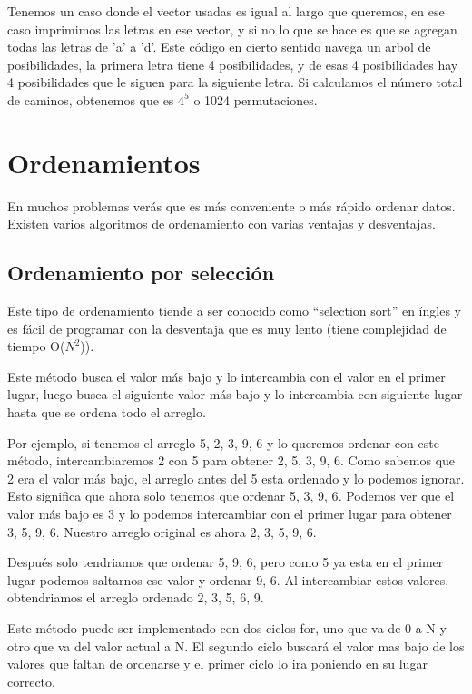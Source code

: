\documentclass{article}
\begin{document}
Tenemos un caso donde el vector usadas es igual al largo que queremos, en ese caso imprimimos las letras en ese vector, y si no lo que se hace es que se agregan todas las letras de 'a' a 'd'. Este código en cierto sentido navega un arbol de posibilidades, la primera letra tiene 4 posibilidades, y de esas 4 posibilidades hay 4 posibilidades que le siguen para la siguiente letra. Si calculamos el número total de caminos, obtenemos que es $4^5$ o 1024 permutaciones.

\section{Ordenamientos}

En muchos problemas verás que es más conveniente o más rápido ordenar datos. Existen varios algoritmos de ordenamiento con varias ventajas y desventajas.

\subsection{Ordenamiento por selección}

Este tipo de ordenamiento tiende a ser conocido como ``selection sort'' en íngles y es fácil de programar con la desventaja que es muy lento (tiene complejidad de tiempo O($N^2$)).

Este método busca el valor más bajo y lo intercambia con el valor en el primer lugar, luego busca el siguiente valor más bajo y lo intercambia con siguiente lugar hasta que se ordena todo el arreglo.

Por ejemplo, si tenemos el arreglo {5, 2, 3, 9, 6} y lo queremos ordenar con este método, intercambiaremos 2 con 5 para obtener {2, 5, 3, 9, 6}. Como sabemos que 2 era el valor más bajo, el arreglo antes del 5 esta ordenado y lo podemos ignorar. Esto significa que ahora solo tenemos que ordenar {5, 3, 9, 6}. Podemos ver que el valor más bajo es 3 y lo podemos intercambiar con el primer lugar para obtener {3, 5, 9, 6}. Nuestro arreglo original es ahora {2, 3, 5, 9, 6}.

Después solo tendriamos que ordenar {5, 9, 6}, pero como 5 ya esta en el primer lugar podemos saltarnos ese valor y ordenar {9, 6}. Al intercambiar estos valores, obtendriamos el arreglo ordenado {2, 3, 5, 6, 9}.

Este método puede ser implementado con dos ciclos for, uno que va de 0 a N y otro que va del valor actual a N. El segundo ciclo buscará el valor mas bajo de los valores que faltan de ordenarse y el primer ciclo lo ira poniendo en su lugar correcto.
\end{document}
